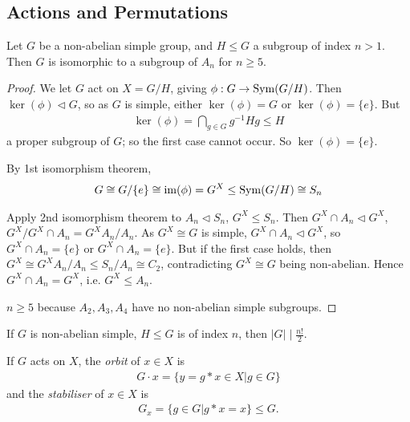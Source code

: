 \documentclass[a4paper]{article}
\begin{document}
\subsection{Actions and Permutations}

\begin{thm}
Let $G$ be a non-abelian simple group, and $H \leq G$ a subgroup of index $n>1$. Then $G$ is isomorphic to a subgroup of $A_n$ for $n \geq 5$.
\begin{proof}
We let $G$ act on $X=G/H$, giving $\phi:G \to \operatorname{Sym}(G/H)$. Then $\ker(\phi) \triangleleft G$, so as $G$ is simple, either $\ker(\phi) = G$ or $\ker(\phi) = \{e\}$. But
\begin{equation*}
\begin{aligned}
\ker(\phi) = \bigcap_{g \in G} g^{-1}Hg \leq H
\end{aligned}
\end{equation*}
a proper subgroup of $G$; so the first case cannot occur. So $\ker(\phi) = \{e\}$.

By 1st isomorphism theorem,
\begin{equation*}
\begin{aligned}
G \cong G/\{e\} \cong \operatorname{im}(\phi) = G^X \leq \operatorname{Sym}(G/H) \cong S_n
\end{aligned}
\end{equation*}

Apply 2nd isomorphism theorem to $A_n \triangleleft S_n$, $G^X \leq S_n$. Then $G^X \cap A_n \triangleleft G^X$, $G^X/G^X\cap A_n = G^X A_n / A_n$.
As $G^X \cong G$ is simple, $G^X \cap A_n \triangleleft G^X$, so $G^X \cap A_n = \{e\}$ or $G^X \cap A_n = \{e\}$. But if the first case holds, then $G^X \cong G^XA_n/A_n \leq S_n / A_n \cong C_2$, contradicting $G^X \cong G$ being non-abelian. Hence $G^X \cap A_n = G^X$, i.e. $G^X \leq A_n$.

$n \geq 5$ because $A_2,A_3,A_4$ have no non-abelian simple subgroups.

\end{proof}
\end{thm}

\begin{coro}
If $G$ is non-abelian simple, $H \leq G$ is of index $n$, then $|G| \mid \frac{n!}{2}$.
\end{coro}

\begin{defi}
If $G$ acts on $X$, the \emph{orbit} of $x \in X$ is
\begin{equation*}
\begin{aligned}
G \cdot x = \{ y=g*x \in X| g \in G\}
\end{aligned}
\end{equation*}
and the \emph{stabiliser} of $x \in X$ is
\begin{equation*}
\begin{aligned}
G_x = \{g\in G|g*x = x\} \leq G.
\end{aligned}
\end{equation*}
\end{defi}
\end{document}
